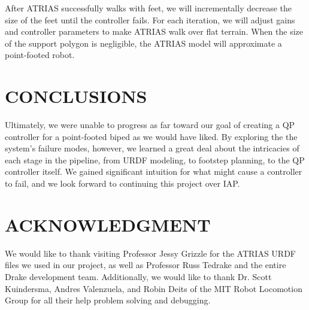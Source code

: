\documentclass[letterpaper, 10 pt, conference]{ieeeconf}  %
\begin{document}
After ATRIAS successfully walks with feet, we will incrementally decrease the size of the feet until the controller fails. For each iteration, we will adjust gains and controller parameters to make ATRIAS walk over flat terrain. When the size of the support polygon is negligible, the ATRIAS model will approximate a point-footed robot.

\section{CONCLUSIONS}

Ultimately, we were unable to progress as far toward our goal of creating a QP controller for a point-footed biped as we would have liked. By exploring the the system's failure modes, however, we learned a great deal about the intricacies of each stage in the pipeline, from URDF modeling, to footstep planning, to the QP controller itself. We gained significant intuition for what might cause a controller to fail, and we look forward to continuing this project over IAP.

\addtolength{\textheight}{-12cm}   %








\section*{ACKNOWLEDGMENT}

We would like to thank visiting Professor Jessy Grizzle for the ATRIAS URDF files we used in our project, as well as Professor Russ Tedrake and the entire Drake development team. Additionally, we would like to thank Dr. Scott Kuindersma, Andres Valenzuela, and Robin Deits of the MIT Robot Locomotion Group for all their help problem solving and debugging.
\end{document}
